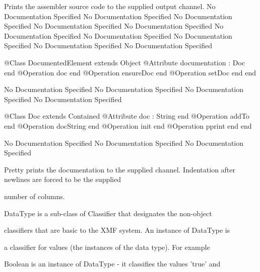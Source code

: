       Prints the assembler source code to the supplied output channel.
No Documentation Specified
No Documentation Specified
No Documentation Specified
No Documentation Specified
No Documentation Specified
No Documentation Specified
No Documentation Specified
No Documentation Specified
No Documentation Specified
No Documentation Specified
\begin{Interface}
@Class DocumentedElement extends Object
  @Attribute documentation : Doc end
  @Operation doc end
  @Operation ensureDoc end
  @Operation setDoc end
end
\end{Interface}
No Documentation Specified
No Documentation Specified
No Documentation Specified
No Documentation Specified
\begin{Interface}
@Class Doc extends Contained
  @Attribute doc : String end
  @Operation addTo end
  @Operation docString end
  @Operation init end
  @Operation pprint end
end
\end{Interface}
No Documentation Specified
No Documentation Specified
No Documentation Specified

      Pretty prints the documentation to the supplied channel.
      Indentation after newlines are forced to be the supplied

      number of columns.

      DataType is a sub-class of Classifier that designates the non-object

      classifiers that are basic to the XMF system. An instance of DataType is

      a classifier for values (the instances of the data type). For example

      Boolean is an instance of DataType - it classifies the values 'true' and

